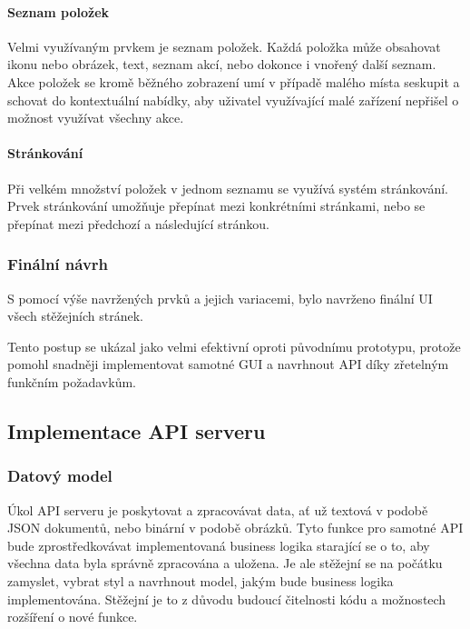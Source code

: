 			\paragraph{Seznam položek}

			Velmi využívaným prvkem je seznam položek.
			Každá položka může obsahovat ikonu nebo obrázek, text, seznam akcí, nebo dokonce i vnořený další seznam.
			Akce položek se kromě běžného zobrazení umí v případě malého místa seskupit a schovat do kontextuální
			nabídky, aby uživatel využívající malé zařízení nepřišel o možnost využívat všechny akce.


			\paragraph{Stránkování}

			Při velkém množství položek v jednom seznamu se využívá systém stránkování.
			Prvek stránkování umožňuje přepínat mezi konkrétními stránkami, nebo se přepínat mezi předchozí a následující stránkou.


		\subsubsection{Finální návrh}

		S pomocí výše navržených prvků a jejich variacemi, bylo navrženo finální \ac{UI} všech stěžejních
		stránek.


		Tento postup se ukázal jako velmi efektivní oproti původnímu prototypu, protože
		pomohl snadněji implementovat samotné \ac{GUI} a navrhnout \ac{API} díky zřetelným funkčním požadavkům.

	\subsection{Implementace API serveru}

		\subsubsection{Datový model}

		Úkol \ac{API} serveru je poskytovat a zpracovávat data, ať už textová v podobě \ac{JSON} dokumentů, nebo binární v podobě
		obrázků.
		Tyto funkce pro samotné API bude zprostředkovávat implementovaná business logika starající se o to, aby všechna data
		byla správně zpracována a uložena.
		Je ale stěžejní se na počátku zamyslet, vybrat styl a navrhnout model, jakým bude business logika implementována.
		Stěžejní je to z důvodu budoucí čitelnosti kódu a možnostech rozšíření o nové funkce.

